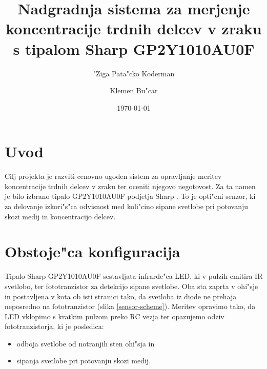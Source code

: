 \documentclass[11pt,a4paper]{article}
\begin{document}
\title{Nadgradnja sistema za merjenje koncentracije trdnih delcev v zraku s tipalom Sharp GP2Y1010AU0F}
\author{"Ziga Pata"cko Koderman \and Klemen Bu"car}
\date{\today}

\clearpage\maketitle
\thispagestyle{empty}
\pagebreak

\tableofcontents
\pagebreak

\section{Uvod}

Cilj projekta je razviti cenovno ugoden sistem za opravljanje meritev koncentracije trdnih delcev v zraku ter oceniti njegovo negotovost. Za ta namen je bilo izbrano tipalo GP2Y1010AU0F podjetja Sharp \cite{sharp-gp2y1010au0f}. To je opti"cni senzor, ki za delovanje izkori"s"ca odvisnost med koli"cino sipane svetlobe pri potovanju skozi medij in koncentracijo delcev.


\pagebreak

\section{Obstoje"ca konfiguracija}

Tipalo Sharp GP2Y1010AU0F \cite{sharp-gp2y1010au0f} sestavljata infrarde"ca LED, ki v pulzih emitira IR svetlobo, ter fototranzistor za detekcijo sipane svetlobe. Oba sta zaprta v ohi"sje in postavljena v kota ob isti stranici tako, da svetloba iz diode ne prehaja neposredno na fototranzistor (slika \ref{sensor-scheme}). Meritev opravimo tako, da LED vklopimo s kratkim pulzom preko RC vezja ter opazujemo odziv fototranzistorja, ki je posledica:
\begin{itemize}
	\item odboja svetlobe od notranjih sten ohi"sja in
	\item sipanja svetlobe pri potovanju skozi medij.
\end{itemize}
\end{document}
